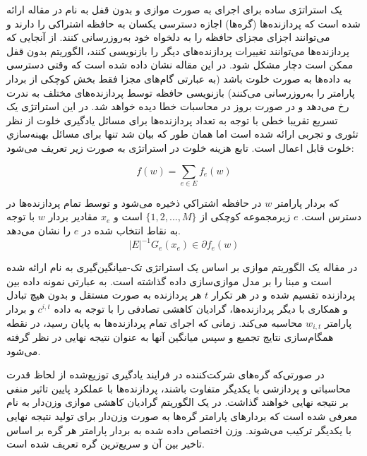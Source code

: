  یک استراتژی ساده برای اجرای  به صورت موازی و بدون قفل به نام  در مقاله \cite{Hog12011} ارائه شده است که پردازنده‌ها (گره‌ها) اجازه دسترسی یکسان به حافظه اشتراکی را دارند و می‌توانند اجزای مجزای حافظه را به دلخواه خود به‌روزرسانی کنند. از آنجایی که پردازنده‌ها می‌توانند تغییرات پردازنده‌های دیگر را بازنویسی کنند، الگوریتم بدون قفل ممکن است دچار مشکل شود. در این مقاله نشان داده شده است که وقتی دسترسی به داده‌ها به صورت خلوت  باشد (به عبارتی گام‌های مجزا  فقط بخش کوچکی از بردار پارامتر را به‌روزرسانی می‌کنند) بازنویسی حافظه توسط پردازنده‌های مختلف به ندرت رخ می‌دهد و در صورت بروز در محاسبات خطا دیده خواهد شد. در این استراتژی یک تسریع تقریبا خطی با توجه به تعداد پردازنده‌ها برای مسائل یادگیری خلوت از نظر تئوری و تجربی ارائه شده است اما همان طور که بیان شد تنها برای مسائل بهينه‌سازي خلوت قابل اعمال است. تابع هزینه خلوت در استراتژی  به صورت زیر تعریف می‌شود:
 
 \begin{equation}\label{e18}
 	f(w)=\sum_{e\in E}f_e(w)
 \end{equation}
 
 که بردار پارامتر $w$ در حافظه اشتراكي ذخيره می‌شود و توسط تمام پردازنده‌ها در دسترس است. $e$ زیرمجموعه کوچکی از $\{1, 2, ...,M\}$ است و $x_e$ مقادير بردار $w$ با توجه به نقاط انتخاب شده در $e$ را نشان می‌دهد. 
 \begin{equation}\label{e19}
 	|E|^{-1}G_e(x_e)\in \partial f_e(w)
 \end{equation}
 
 در مقاله \cite{Zin2010} یک الگوریتم  موازی بر اساس یک استراتژی تک-میانگین‌گیری  به نام  ارائه شده است و مبنا را بر مدل موازی‌سازی داده گذاشته است. به عبارتی  نمونه داده بین  پردازنده تقسیم شده و در هر تکرار $t$ هر پردازنده  به صورت مستقل و بدون هیچ تبادل و همکاری با دیگر پردازنده‌ها، گرادیان کاهشی تصادفی را با توجه به داده‌ $c^{i,t}$ و بردار پارامتر $w_{i,t}$ محاسبه می‌کند. زمانی که اجرای تمام پردازنده‌ها به پایان رسید، در نقطه همگام‌سازی نتایج تجمیع و سپس میانگین آنها به عنوان نتیجه نهایی در نظر گرفته می‌شود.
 
در صورتی‌که گره‌های شرکت‌کننده در فرایند یادگیری توزیع‌شده از لحاظ قدرت محاسباتی و پردازشی با یکدیگر متفاوت باشند، پردازنده‌ها با عملکرد پایین تاثیر منفی بر نتیجه نهایی خواهند گذاشت. در \cite{WP2020} یک الگوریتم گرادیان کاهشی موازی وزن‌دار به نام  معرفی شده است که بردارهای پارامتر گره‌ها به صورت وزن‌دار برای تولید نتیجه نهایی با یکدیگر ترکیب می‌شوند. وزن اختصاص داده شده به بردار پارامتر هر گره بر اساس تاخیر بین آن و سریع‌ترین گره تعریف شده است.
 
